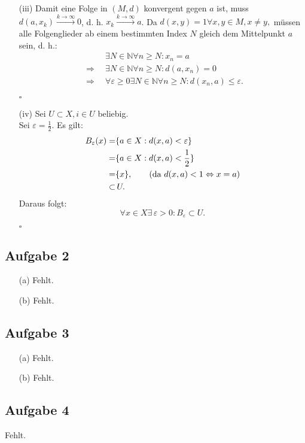 \documentclass[12pt]{article}
\newcommand{\QED}{\begin{flushright} $\square$ \end{flushright}}
\newcommand{\df}{\enspace\Longrightarrow\enspace}
\begin{document}
\begin{enumerate}
	\item[(iii)] Damit eine Folge in $(M,d)$ konvergent gegen $a$ ist, muss $d(a,x_k)\overset{k\rightarrow\infty}{\longrightarrow}0$, d. h. $x_k\overset{k\rightarrow\infty}{\longrightarrow}a$. Da $d(x,y)=1\forall x,y\in M, x\neq y,$ müssen alle Folgenglieder ab einem bestimmten Index $N$ gleich dem Mittelpunkt $a$ sein, d. h.: \\
	\begin{align*}
		&\exists N\in\mathbb{N}\forall n\geq N: x_n=a \\
		\df &\exists N\in\mathbb{N}\forall n\geq N:d(a,x_n)=0 \\
		\df &\forall\varepsilon\geq0\exists N\in\mathbb{N}\forall n\geq N:d(x_n,a)\leq\varepsilon.
	\end{align*}
	\QED
	
	\item[(iv)] Sei $U\subset X, i\in U$ beliebig. \\
	Sei $\varepsilon=\frac{1}{2}$. Es gilt:
	\begin{align*}
		B_{\varepsilon}(x)=&\{a\in X:d(x,a)<\varepsilon\} \\
		=&\{a\in X:d(x,a)<\frac{1}{2}\} \\
		=&\{x\},\quad\quad\text{(da }d(x,a)<1\Leftrightarrow x=a\text) \\
		\subset&\,U.
	\end{align*}
	Daraus folgt: $$\forall x\in X\exists\,\varepsilon>0:B_{\varepsilon}\subset U.$$
	\QED
\end{enumerate}

\subsection*{Aufgabe 2}
\begin{enumerate}
	\item[(a)] Fehlt.
	
	\item[(b)] Fehlt.
\end{enumerate}

\subsection*{Aufgabe 3}
\begin{enumerate}
	\item[(a)] Fehlt.
	
	\item[(b)] Fehlt.
\end{enumerate}

\subsection*{Aufgabe 4}
Fehlt.
\end{document}
